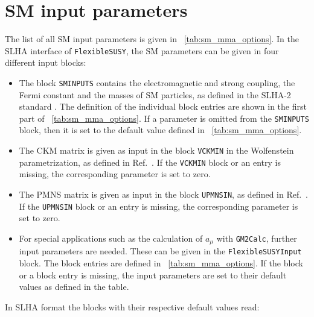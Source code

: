 \documentclass[final,3p,11pt,pdflatex]{elsarticle}
\makeatletter
\newcommand{\fs}{\texttt{FlexibleSUSY}\@\xspace}
\newcommand{\GMTCalc}{\texttt{GM2Calc}\@\xspace}
\newcommand{\amu}{\ensuremath{a_\mu}\xspace}
\newcommand{\tabref}[1]{\tablename~\ref{#1}}
\makeatother
\begin{document}
\appendix
\renewcommand*{\thesection}{\Alph{section}}

\section{SM input parameters}
\label{app:sm_input_parameters}
%
The list of all SM input parameters is given
in \tabref{tab:sm_mma_options}.  In the SLHA interface of \fs, the
SM parameters can be given in four different input blocks:
%
\begin{itemize}
\item The block \texttt{SMINPUTS} contains the electromagnetic and
  strong coupling, the Fermi constant and the masses of SM
  particles, as defined in the SLHA-2 standard \cite{Allanach:2008qq}.
  The definition of the individual block entries are shown in the
  first part of \tabref{tab:sm_mma_options}.  If a parameter is
  omitted from the \texttt{SMINPUTS} block, then it is set to the
  default value defined in \tabref{tab:sm_mma_options}.
\item The CKM matrix is given as input in the block \texttt{VCKMIN} in
  the Wolfenstein parametrization, as defined in
  Ref.~\cite{Allanach:2008qq}.  If the \texttt{VCKMIN} block or an entry is
  missing, the corresponding parameter is set to zero.
\item The PMNS matrix is given as input in the block
  \texttt{UPMNSIN}, as defined in Ref.~\cite{Allanach:2008qq}.  If the
  \texttt{UPMNSIN} block or an entry is missing, the corresponding
  parameter is set to zero.
\item For special applications such as the calculation of
  $\amu$ with \GMTCalc, further input parameters are
  needed.  These can be given in the \texttt{FlexibleSUSYInput} block.
  The block entries are defined in \tabref{tab:sm_mma_options}.  If
  the block or a block entry is missing, the input parameters are set
  to their default values as defined in the table.
\end{itemize}
%
In SLHA format the blocks with their respective default values read:
%
\end{document}
